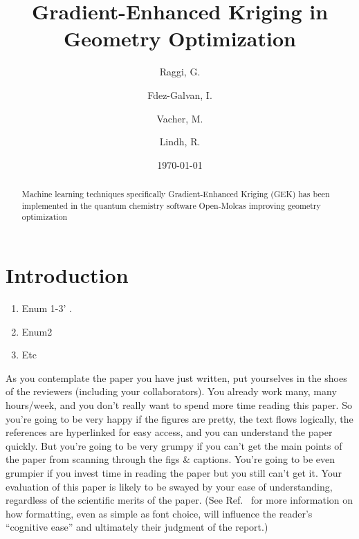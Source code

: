 \documentclass[aps,prb,twocolumn,superscriptaddress,floatfix,longbibliography]{revtex4-2}
\begin{document}
\title{Gradient-Enhanced Kriging in Geometry Optimization}

\author{Raggi, G.}
\author{Fdez-Galvan, I.}
\author{Vacher, M.} 
\author{Lindh, R.}

\date{\today}

\begin{abstract}
Machine learning techniques specifically Gradient-Enhanced Kriging (GEK) has been implemented in the quantum chemistry software Open-Molcas\cite{Aquilante2016} improving geometry optimization
\end{abstract}

\maketitle
\section{\label{sec:Start}Introduction}

\begin{enumerate}
\item Enum 1-3' \cite{WhitesidesAdvMat2004}.

\item Enum2 

\item Etc

\end{enumerate}
\vspace{-1mm}

As you contemplate the paper you have just written, put yourselves in the shoes of the reviewers (including your collaborators). You already work many, many hours/week, and you don't really want to spend more time reading this paper. So you're going to be very happy if the figures are pretty, the text flows logically, the references are hyperlinked for easy access, and you can understand the paper quickly. But you're going to be very grumpy if you can't get the main points of the paper from scanning through the figs \& captions. You're going to be even grumpier if you invest time in reading the paper but you still can't get it. Your evaluation of this paper is likely to be swayed by your ease of understanding, regardless of the scientific merits of the paper. (See Ref.\  for more information on how formatting, even as simple as font choice, will influence the reader's ``cognitive ease'' and ultimately their judgment of the report.)
\end{document}
